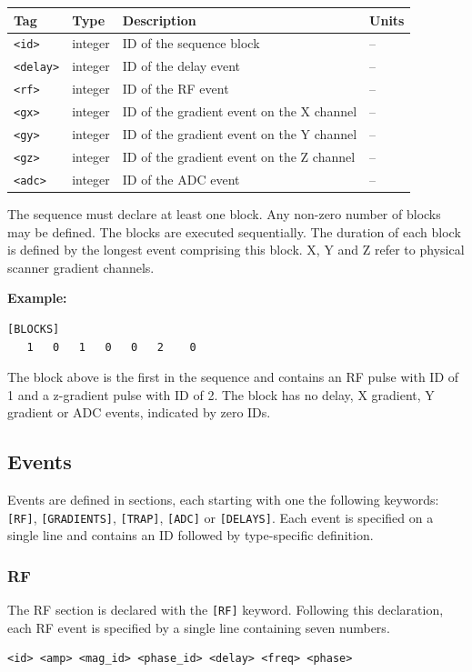 \documentclass{article}
\begin{document}
\begin{tabularx}{\textwidth}{llXl}
\toprule
Tag & Type & Description & Units\\
\midrule
\verb.<id>. & integer & ID of the sequence block & -- \\
\verb.<delay>. & integer & ID of the delay event & -- \\
\verb.<rf>. & integer & ID of the RF event & -- \\
\verb.<gx>. & integer & ID of the gradient event on the X channel & --\\
\verb.<gy>. & integer & ID of the gradient event on the Y channel & -- \\
\verb.<gz>. & integer & ID of the gradient event on the Z channel & -- \\
\verb.<adc>. & integer & ID of the ADC event & -- \\
\bottomrule
\end{tabularx}

\begin{minipage}{\textwidth}
The sequence must declare at least one block. Any non-zero number of blocks may be defined. The blocks are executed sequentially. The duration of each block is defined by the longest event comprising this block. X, Y and Z refer to physical scanner gradient channels.


\textbf{Example:}
\begin{lstlisting}
[BLOCKS]
   1   0   1   0   0   2    0
\end{lstlisting}
\end{minipage}

The block above is the first in the sequence and contains an RF pulse with ID of 1 and a z-gradient pulse with ID of 2. The block has no delay, X gradient, Y gradient or ADC events, indicated by zero IDs.

\subsection{Events}

Events are defined in sections, each starting with one the following keywords: \verb.[RF]., \verb.[GRADIENTS]., \verb.[TRAP]., \verb.[ADC]. or \verb.[DELAYS].. Each event is specified on a single line and contains an ID followed by type-specific definition.

\subsubsection{RF}
The RF section is declared with the \verb.[RF]. keyword. Following this declaration, each RF event is specified by a single line containing seven numbers.
\begin{lstlisting}
<id> <amp> <mag_id> <phase_id> <delay> <freq> <phase>
\end{lstlisting}
\end{document}
